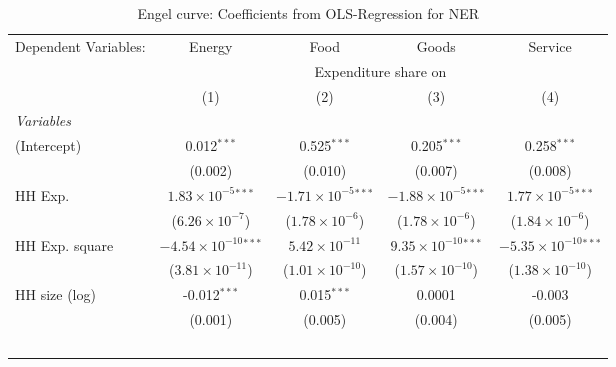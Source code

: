 
\begin{table}[htbp!]
   \centering
   \small
   \begin{adjustbox}{width = 1\textwidth, max height = 0.95\textheight, center}
      \begin{threeparttable}[b]
         \caption{\label{tab:Engel_parametric_NER} Engel curve: Coefficients from OLS-Regression for NER}
         \begin{tabular}{lcccc}
            \tabularnewline \midrule \midrule
            Dependent Variables: & Energy                          & Food                           & Goods                          & Service\\  
             & \multicolumn{4}{c}{Expenditure share on} \\ 
                                 & (1)                             & (2)                            & (3)                            & (4)\\  
            \midrule
            \emph{Variables}\\
            (Intercept)          & 0.012$^{***}$                   & 0.525$^{***}$                  & 0.205$^{***}$                  & 0.258$^{***}$\\   
                                 & (0.002)                         & (0.010)                        & (0.007)                        & (0.008)\\   
            HH Exp.              & $1.83\times 10^{-5}$$^{***}$    & $-1.71\times 10^{-5}$$^{***}$  & $-1.88\times 10^{-5}$$^{***}$  & $1.77\times 10^{-5}$$^{***}$\\    
                                 & ($6.26\times 10^{-7}$)          & ($1.78\times 10^{-6}$)         & ($1.78\times 10^{-6}$)         & ($1.84\times 10^{-6}$)\\    
            HH Exp. square       & $-4.54\times 10^{-10}$$^{***}$  & $5.42\times 10^{-11}$          & $9.35\times 10^{-10}$$^{***}$  & $-5.35\times 10^{-10}$$^{***}$\\    
                                 & ($3.81\times 10^{-11}$)         & ($1.01\times 10^{-10}$)        & ($1.57\times 10^{-10}$)        & ($1.38\times 10^{-10}$)\\    
            HH size (log)        & -0.012$^{***}$                  & 0.015$^{***}$                  & 0.0001                         & -0.003\\   
                                 & (0.001)                         & (0.005)                        & (0.004)                        & (0.005)\\   
$$
\end{tabular}
\end{threeparttable}
\end{adjustbox}
\end{table}
